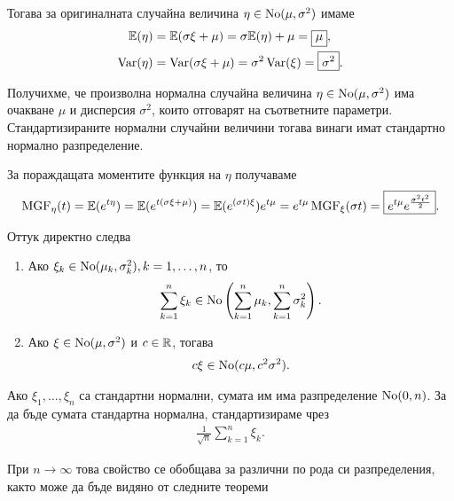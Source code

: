 \documentclass[numbers=endperiod, bibliography=totocnumbered]{scrartcl}
\begin{document}
Тогава за оригиналната случайна величина \( \eta \in \operatorname{No}(\mu, \sigma^2) \) имаме
\begin{align*}
  \mathbb{E}(\eta) &= \mathbb{E}(\sigma \xi + \mu) = \sigma \mathbb{E}(\eta) + \mu = \boxed{\mu}, \\
  \operatorname{Var}(\eta) &= \operatorname{Var}(\sigma \xi + \mu) = \sigma^2 \operatorname{Var}(\xi) = \boxed{\sigma^2}.
\end{align*}

Получихме, че произволна нормална случайна величина \( \eta \in \operatorname{No}(\mu, \sigma^2) \) има очакване \( \mu \) и дисперсия \( \sigma^2 \), които отговарят на съответните параметри. Стандартизираните нормални случайни величини тогава винаги имат стандартно нормално разпределение.

За пораждащата моментите функция на \( \eta \) получаваме
\begin{align*}
  \operatorname{MGF}_\eta(t)
  =
  \mathbb{E}(e^{t\eta})
  =
  \mathbb{E}(e^{t(\sigma\xi + \mu)})
  =
  \mathbb{E}(e^{(\sigma t) \xi}) e^{t\mu}
  =
  e^{t\mu} \operatorname{MGF}_\xi(\sigma t)
  =
  \boxed{e^{t\mu} e^{\frac {\sigma^2 t^2} 2}}.
\end{align*}

Оттук директно следва
\begin{proposition}\label{thm:normal-operations}
  \mbox{}
  \begin{enumerate}
    \item Ако \( \xi_k \in \operatorname{No}(\mu_k, \sigma_k^2), k = 1, \ldots, n \), то
    \begin{align*}
      \sum_{k=1}^n \xi_k \in \operatorname{No}\left( \sum_{k=1}^n \mu_k, \sum_{k=1}^n \sigma_k^2 \right).
    \end{align*}

    \item Ако \( \xi \in \operatorname{No}(\mu, \sigma^2) \) и \( c \in \mathbb{R} \), тогава
    \begin{align*}
      c \xi \in \operatorname{No}(c \mu, c^2 \sigma^2).
    \end{align*}
  \end{enumerate}
\end{proposition}

Ако \( \xi_1, \ldots, \xi_n \) са стандартни нормални, сумата им има разпределение \( \operatorname{No}(0, n) \). За да бъде сумата стандартна нормална, стандартизираме чрез
\begin{align*}
  \frac 1 {\sqrt n} \sum_{k=1}^n \xi_k.
\end{align*}

При \( n \to \infty \) това свойство се обобщава за различни по рода си разпределения, както може да бъде видяно от следните теореми
\end{document}
